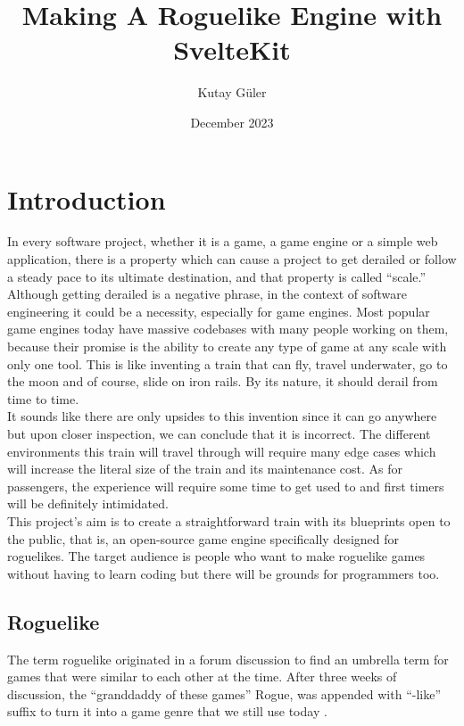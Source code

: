 \documentclass{article}
\begin{document}
\title{Making A Roguelike Engine with SvelteKit}
\author{Kutay Güler}
\date{December 2023}


\maketitle
\tableofcontents

\section{Introduction}
In every software project, whether it is a game, a game engine or a simple web application, there is a property which can cause a project to get derailed or follow a steady pace to its ultimate destination, and that property is called “scale.”\\ 

Although getting derailed is a negative phrase, in the context of software engineering it could be a necessity, especially for game engines. Most popular game engines today have massive codebases with many people working on them, because their promise is the ability to create any type of game at any scale with only one tool. This is like inventing a train that can fly, travel underwater, go to the moon and of course, slide on iron rails. By its nature, it should derail from time to time.\\

It sounds like there are only upsides to this invention since it can go anywhere but upon closer inspection, we can conclude that it is incorrect. The different environments this train will travel through will require many edge cases which will increase the literal size of the train and its maintenance cost. As for passengers, the experience will require some time to get used to and first timers will be definitely intimidated.\\ 

This project’s aim is to create a straightforward train with its blueprints open to the public, that is, an open-source game engine specifically designed for roguelikes. The target audience is people who want to make roguelike games without having to learn coding but there will be grounds for programmers too.\\ 

\subsection{Roguelike}
The term roguelike originated in a forum discussion to find an umbrella term for games that were similar to each other at the time. After three weeks of discussion, the “granddaddy of these games” Rogue, was appended with “-like” suffix to turn it into a game genre that we still use today \cite{roguelike-term}.\\ 
\end{document}
